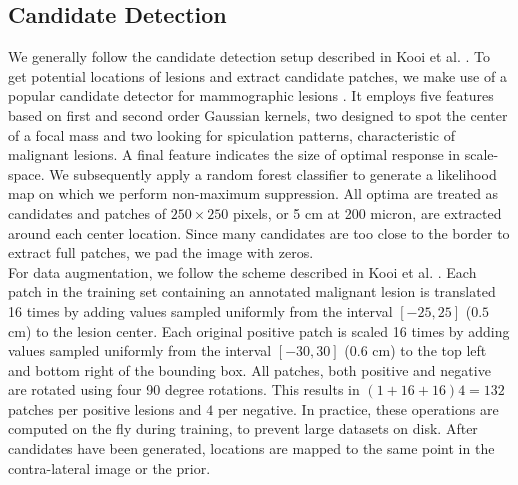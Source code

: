 \documentclass[12pt]{spieman}  %
\begin{document}
\subsection{Candidate Detection}
\label{sec::candidate_detection}
We generally follow the candidate detection setup described in Kooi et al. \cite{Kooi16}. To get potential locations of lesions and extract candidate patches, we make use of a popular candidate detector for mammographic lesions \cite{Kars96a}. It employs five features based on first and second order Gaussian kernels, two designed to spot the center of a focal mass and two looking for spiculation patterns, characteristic of malignant lesions. A final feature indicates the size of optimal response in scale-space. We subsequently apply a random forest \cite{Brei01} classifier to generate a likelihood map on which we perform non-maximum suppression. All optima are treated as candidates and patches of $250 \times 250$ pixels, or 5 cm at 200 micron, are extracted around each center location. Since many candidates are too close to the border to extract full patches, we pad the image with zeros. \\

For data augmentation, we follow the scheme described in Kooi et al. \cite{Kooi16}. Each patch in the training set containing an annotated malignant lesion is translated 16 times by adding values sampled uniformly from the interval $[-25, 25]$ ($0.5$ cm) to the lesion center. Each original positive patch is scaled 16 times by adding values sampled uniformly from the interval $[-30, 30]$ ($0.6$ cm) to the top left and bottom right of the bounding box. All patches, both positive and negative are rotated using four 90 degree rotations. This results in $(1+16+16)4 = 132$ patches per positive lesions and $4$ per negative. In practice, these operations are computed on the fly during training, to prevent large datasets on disk. After candidates have been generated, locations are mapped to the same point in the contra-lateral image or the prior. 
\end{document}
